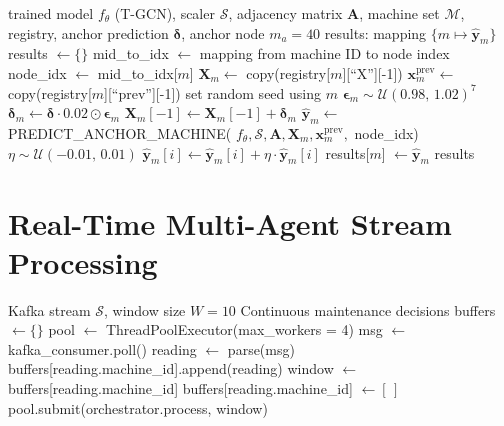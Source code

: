 \begin{appendices}
\begin{algorithm}[H]
\small
\caption{Propagation of Anchor Prediction to Fleet}
\label{alg:propagate_fleet}
\begin{algorithmic}[1]
\Require trained model $f_{\theta}$ (T-GCN), scaler $\mathcal{S}$, adjacency matrix $\mathbf{A}$, machine set $\mathcal{M}$, registry, anchor prediction $\boldsymbol{\delta}$, anchor node $m_a = 40$
\Ensure results: mapping $\{ m \mapsto \hat{\mathbf{y}}_m \}$
\State results $\gets \{\}$
\State mid\_to\_idx $\gets$ mapping from machine ID to node index
    \State node\_idx $\gets$ mid\_to\_idx[$m$]
    \State $\mathbf{X}_m \gets$ copy(registry[$m$][``X''][-1])
    \State $\mathbf{x}_m^{\text{prev}} \gets$ copy(registry[$m$][``prev''][-1])
    \State set random seed using $m$ 
    \State $\boldsymbol{\epsilon}_m \sim \mathcal{U}(0.98,\, 1.02)^7$
    \State $\boldsymbol{\delta}_m \gets \boldsymbol{\delta} \cdot 0.02 \odot \boldsymbol{\epsilon}_m$
    \State $\mathbf{X}_m[-1] \gets \mathbf{X}_m[-1] + \boldsymbol{\delta}_m$
    \State $\hat{\mathbf{y}}_m \gets$ PREDICT\_ANCHOR\_MACHINE(
    \Statex \hspace{2em} $f_{\theta}, \mathcal{S}, \mathbf{A}, \mathbf{X}_m, \mathbf{x}_m^{\text{prev}},$ node\_idx)
    \State {}
        \State $\eta \sim \mathcal{U}(-0.01,\, 0.01)$
        \State $\hat{\mathbf{y}}_m[i] \gets \hat{\mathbf{y}}_m[i] + \eta \cdot \hat{\mathbf{y}}_m[i]$
    \EndFor
    \State results[$m$] $\gets \hat{\mathbf{y}}_m$
\EndFor
\State \Return results
\end{algorithmic}
\end{algorithm}

\section{Real-Time Multi-Agent Stream Processing}

\begin{algorithm}[H]
\small
\caption{Non-Blocking Windowed Stream Processing}
\label{alg:stream_processing}
\begin{algorithmic}[1]
\Require Kafka stream $\mathcal{S}$, window size $W = 10$
\Ensure Continuous maintenance decisions
\State buffers $\gets \{\}$ 
\State pool $\gets$ ThreadPoolExecutor(max\_workers = 4)
    \State msg $\gets$ kafka\_consumer.poll()
    \State reading $\gets$ parse(msg) 
    \State buffers[reading.machine\_id].append(reading)
        \State window $\gets$ buffers[reading.machine\_id]
        \State buffers[reading.machine\_id] $\gets [\,]$
        \State pool.submit(orchestrator.process, window)
        \State {}
    \EndIf
\EndWhile
\end{algorithmic}
\end{algorithm}


\end{appendices}
